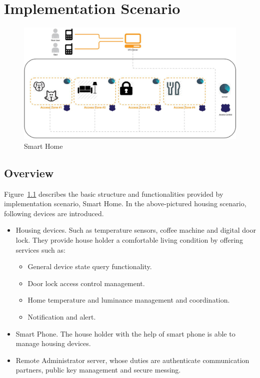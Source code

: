 \chapter{Implementation Scenario}
 \begin{figure}[!htbp]
	\centering
	\includegraphics[width=1\textwidth]{homeoverview.jpg}
		\caption{Smart Home}
	\label{fig:SmartHome}
\end{figure}

\section{Overview}
Figure~\ref{fig:SmartHome} describes the basic structure and functionalities provided by implementation scenario, Smart Home. In the above-pictured housing scenario, following devices are introduced.
\begin{itemize}
\item Housing devices. Such as temperature sensors, coffee machine and digital door lock. They provide house holder a comfortable living condition by offering services such as:
\begin{itemize}
\item General device state query functionality.
\item Door lock access control management.
\item Home temperature and luminance management and coordination.
\item Notification and alert.
\end{itemize}
\item Smart Phone. The house holder with the help of smart phone is able to manage housing devices.
\item Remote Administrator server, whose duties are authenticate communication partners, public key management and secure messing.
\end{itemize}

